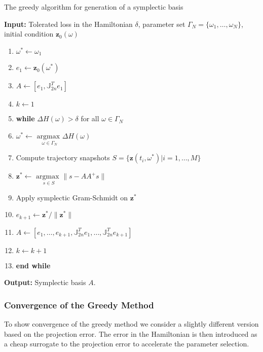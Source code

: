 \documentclass[final]{siamart}
\begin{document}
\begin{algorithm} 
\caption{The greedy algorithm for generation of a symplectic basis} \label{alg:SyMo:3}
{\bf Input:} Tolerated loss in the Hamiltonian $\delta$, parameter set $\Gamma_N = \{\omega_1,\dots,\omega_N\}$, initial condition $\mathbf z_0(\omega)$
\begin{enumerate}
\item $\omega^* \leftarrow \omega_1$
\item $e_1 \leftarrow \mathbf z_0(\omega^*)$
\item $A \leftarrow [e_1,\mathbb J^T_{2n}e_1]$
\item $k \leftarrow 1$
\item \textbf{while} $\Delta H(\omega) > \delta$ for all $\omega \in \Gamma_N$
\item \hspace{0.5cm} $\omega^* \leftarrow$ $\underset{\omega\in \Gamma_N}{\text{argmax }}\Delta H(\omega)$
\item \hspace{0.5cm} Compute trajectory snapshots $S=\{ \mathbf z(t_i,\omega^*) | i = 1,\dots,M \}$
\item \hspace{0.5cm} $\mathbf z^* \leftarrow$ $\underset{s\in S}{\text{argmax }} \| s - AA^+s \|$
\item \hspace{0.5cm} Apply symplectic Gram-Schmidt on $\mathbf z^*$
\item \hspace{0.5cm} $e_{k+1} \leftarrow \mathbf z^*/ \| \mathbf  z^*\|$
\item \hspace{0.5cm} $A \leftarrow [e_1,\dots ,e_{k+1} , \mathbb J^T_{2n}e_1,\dots,\mathbb J^T_{2n}e_{k+1}]$
\item \hspace{0.5cm} $k \leftarrow k+1$
\item \textbf{end while}
\end{enumerate}
\vspace{0.5cm}
{\bf Output:} Symplectic basis $A$.
\end{algorithm}

\subsubsection{Convergence of the Greedy Method} \label{chap:SyMo.PrSy:3}

To show convergence of the greedy method we {{\color{black}} consider} a slightly different version based on the projection error. The error in the Hamiltonian is then introduced as a cheap surrogate to the projection error to accelerate the parameter selection.
\end{document}

